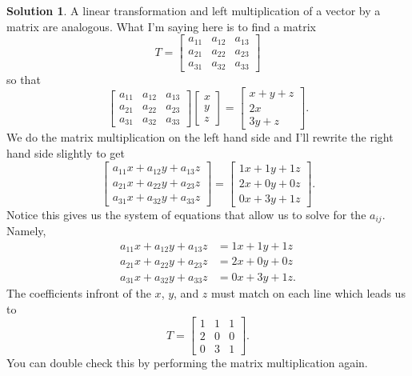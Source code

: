 \documentclass[12pt]{report} %
\theoremstyle{definition}
\newtheorem{solution}{Solution}
\begin{document}
\begin{solution}
A linear transformation and left multiplication of a vector by a matrix are analogous.  What I'm saying here is to find a matrix
\[
T=\begin{bmatrix} a_{11} & a_{12} & a_{13} \\ a_{21} & a_{22} & a_{23} \\ a_{31} & a_{32} & a_{33}\end{bmatrix}
\]
so that
\[
\begin{bmatrix} a_{11} & a_{12} & a_{13} \\ a_{21} & a_{22} & a_{23} \\ a_{31} & a_{32} & a_{33}\end{bmatrix} \begin{bmatrix} x\\y\\z \end{bmatrix} = \begin{bmatrix} x+y+z\\2x\\3y+z\end{bmatrix}.
\]
We do the matrix multiplication on the left hand side and I'll rewrite the right hand side slightly to get
\[
\begin{bmatrix} a_{11}x+a_{12}y+a_{13}z\\a_{21}x+a_{22}y+a_{23}z\\a_{31}x+a_{32}y+a_{33}z\end{bmatrix} = \begin{bmatrix} 1x+1y+1z\\2x+0y+0z\\0x+3y+1z\end{bmatrix}.
\]
Notice this gives us the system of equations that allow us to solve for the $a_{ij}$. Namely,
\begin{align*}
    a_{11}x+a_{12}y+a_{13}z&=1x+1y+1z\\
    a_{21}x+a_{22}y+a_{23}z&=2x+0y+0z\\
    a_{31}x+a_{32}y+a_{33}z&=0x+3y+1z.
\end{align*}
The coefficients infront of the $x$, $y$, and $z$ must match on each line which leads us to
\[
T=\begin{bmatrix} 1 & 1 & 1\\ 2 & 0 & 0\\ 0 & 3 & 1\end{bmatrix}.
\]
You can double check this by performing the matrix multiplication again.
\end{solution}
\end{document}
